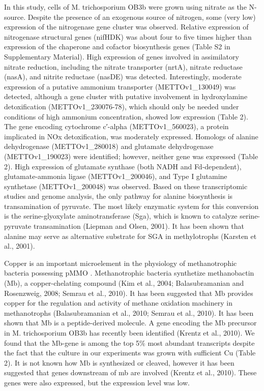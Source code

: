 In this study, cells of M. trichosporium OB3b were grown using nitrate as the N-source.
Despite the presence of an exogenous source of nitrogen, some (very low) expression of the nitrogenase gene cluster was observed.
Relative expression of nitrogenase structural genes (nifHDK) was about four to five times higher than expression of the chaperone and cofactor biosynthesis genes (Table S2 in Supplementary Material).
High expression of genes involved in assimilatory nitrate reduction, including the nitrate transporter (nrtA), nitrate reductase (nasA), and nitrite reductase (nasDE) was detected.
Interestingly, moderate expression of a putative ammonium transporter (METTOv1\_130049) was detected, although a gene cluster with putative involvement in hydroxylamine detoxification (METTOv1\_230076-78), which should only be needed under conditions of high ammonium concentration, showed low expression (Table 2).
The gene encoding cytochrome c′-alpha (METTOv1\_560023), a protein implicated in NOx detoxification, was moderately expressed.
Homologs of alanine dehydrogenase (METTOv1\_280018) and glutamate dehydrogenase (METTOv1\_190023) were identified; however, neither gene was expressed (Table 2).
High expression of glutamate synthase (both NADH and Fd-dependent), glutamate-ammonia ligase (METTOv1\_200046), and Type I glutamine synthetase (METTOv1\_200048) was observed.
Based on these transcriptomic studies and genome analysis, the only pathway for alanine biosynthesis is transamination of pyruvate.
The most likely enzymatic system for this conversion is the serine-glyoxylate aminotransferase (Sga), which is known to catalyze serine-pyruvate transamination (Liepman and Olsen, 2001).
It has been shown that alanine may serve as alternative substrate for SGA in methylotrophs (Karsten et al., 2001).

Copper is an important microelement in the physiology of methanotrophic bacteria possessing pMMO \cite{anthony1982}.
Methanotrophic bacteria synthetize methanobactin (Mb), a copper-chelating compound (Kim et al., 2004; Balasubramanian and Rosenzweig, 2008; Semrau et al., 2010).
It has been suggested that Mb provides copper for the regulation and activity of methane oxidation machinery in methanotrophs (Balasubramanian et al., 2010; Semrau et al., 2010).
It has been shown that Mb is a peptide-derived molecule.
A gene encoding the Mb precursor in M. trichosporium OB3b has recently been identified (Krentz et al., 2010).
We found that the Mb-gene is among the top 5\% most abundant transcripts despite the fact that the culture in our experiments was grown with sufficient Cu (Table 2).
It is not known how Mb is synthesized or cleaved, however it has been suggested that genes downstream of mb are involved (Krentz et al., 2010).
These genes were also expressed, but the expression level was low.

